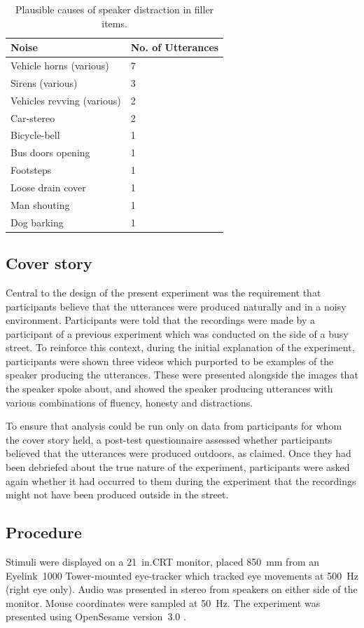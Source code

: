 \documentclass[a4paper,man,natbib]{apa6}
\begin{document}
\begin{table}
\caption{Plausible causes of speaker distraction in filler items.}
\label{table:fillernoise}
\begin{tabularx}{\linewidth}{YY}
\hline
Noise & No. of Utterances\\
\hline
Vehicle horns (various) & 7 \\
Sirens (various) & 3 \\
Vehicles revving (various) & 2 \\
Car-stereo & 2 \\
Bicycle-bell & 1 \\
Bus doors opening & 1 \\
Footsteps & 1 \\
Loose drain cover & 1 \\
Man shouting & 1 \\
Dog barking & 1 \\
\hline
\end{tabularx}
\end{table}

\subsection{Cover story}
Central to the design of the present experiment was the requirement that participants believe that the utterances were produced naturally and in a noisy environment. 
Participants were told that the recordings were made by a participant of a previous experiment which was conducted on the side of a busy street. 
To reinforce this context, during the initial explanation of the experiment, participants were shown three videos which purported to be examples of the speaker producing the utterances. 
These were presented alongside the images that the speaker spoke about, and showed the speaker producing utterances with various combinations of fluency, honesty and distractions.

To ensure that analysis could be run only on data from participants for whom the cover story held, a post-test questionnaire assessed whether participants believed that the utterances were produced outdoors, as claimed.
Once they had been debriefed about the true nature of the experiment, participants were asked again whether it had occurred to them during the experiment that the recordings might not have been produced outside in the street.

\subsection{Procedure}
Stimuli were displayed on a 21~in.\@ CRT monitor, placed 850~mm from an Eyelink~1000 Tower-mounted eye-tracker which tracked eye movements at 500~Hz (right eye only). 
Audio was presented in stereo from speakers on either side of the monitor. 
Mouse coordinates were sampled at 50~Hz. 
The experiment was presented using OpenSesame version~3.0 \citep{Mathot2012}.
\end{document}
